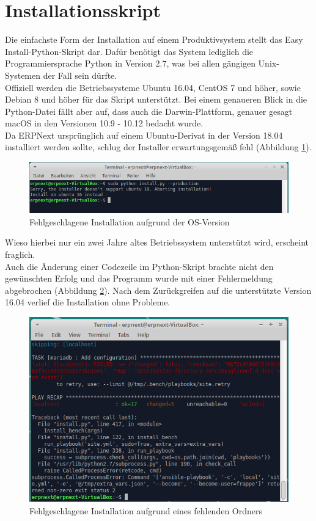 \section{Installationsskript}
Die einfachste Form der Installation auf einem Produktivsystem stellt das \glqq Easy Install\grqq-Python-Skript dar. Dafür benötigt das System lediglich die Programmiersprache Python in Version 2.7, was bei allen gängigen Unix-Systemen der Fall sein dürfte. \\
Offiziell werden die Betriebssysteme Ubuntu 16.04, CentOS 7 und höher, sowie Debian 8 und höher für das Skript unterstützt. Bei einem genaueren Blick in die Python-Datei fällt aber auf, dass auch die Darwin-Plattform, genauer gesagt macOS in den Versionen 10.9 - 10.12 bedacht wurde.\\
Da ERPNext ursprünglich auf einem Ubuntu-Derivat in der Version 18.04 installiert werden sollte, schlug der Installer erwartungsgemäß fehl (\vgl Abbildung \ref{fig:fehlInst}).
\begin{figure}[H]
  \centering
  \includegraphics[width=\textwidth]{Bilder/Fehlgeschlagene_Installation.PNG}
  \caption{Fehlgeschlagene Installation aufgrund der OS-Version}
  \label{fig:fehlInst}
\end{figure}
Wieso hierbei nur ein zwei Jahre altes Betriebssystem  unterstützt wird, erscheint fraglich.\\
Auch die Änderung einer Codezeile im Python-Skript brachte nicht den gewünschten Erfolg und das Programm wurde mit einer Fehlermeldung abgebrochen (\vgl Abbildung \ref{fig:fehlInst2}). Nach dem Zurückgreifen auf die unterstützte Version 16.04 verlief die Installation ohne Probleme.
\begin{figure}
  \centering
  \includegraphics[width=\textwidth]{Bilder/Fehlgeschlagene_Installation_2.PNG}
  \caption{Fehlgeschlagene Installation aufgrund eines fehlenden Ordners}
  \label{fig:fehlInst2}
\end{figure}

